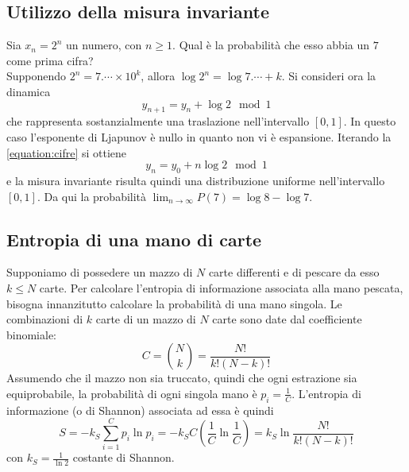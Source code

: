 \documentclass[12pt, a4paper]{book}
\theoremstyle{theorem}
\begin{document}
			\subsection{Utilizzo della misura invariante}
				Sia $x_{n}=2^{n}$ un numero, con $n \geq 1$.
				Qual è la probabilità che esso abbia un $7$ come prima cifra?
				\\Supponendo $2^{n}=7.\cdots\times 10^{k}$, allora $\log{2^{n}}=\log{7.\cdots}+k$.
				Si consideri ora la dinamica
				\begin{equation}
					y_{n+1}=y_{n}+\log2\mod1
					\label{equation:cifre}
				\end{equation}
				che rappresenta sostanzialmente una traslazione nell'intervallo $[0,1]$.
				In questo caso l'esponente di Ljapunov è nullo in quanto non vi è espansione.
				Iterando la \ref{equation:cifre} si ottiene
				\begin{equation*}
					y_{n}=y_{0}+n\log2\mod1
				\end{equation*}
				e la misura invariante risulta quindi una distribuzione uniforme nell'intervallo $[0,1]$.
				Da qui la probabilità $\lim_{n\to\infty}P(7)=\log8-\log7$.
			\subsection{Entropia di una mano di carte}
				Supponiamo di possedere un mazzo di $N$ carte differenti e di pescare da esso $k\leq N$ carte.
				Per calcolare l'entropia di informazione associata alla mano pescata, bisogna innanzitutto calcolare la probabilità di una mano singola.
				Le combinazioni di $k$ carte di un mazzo di $N$ carte sono date dal coefficiente binomiale:
				\begin{equation}
					C=\binom{N}{k}=\frac{N!}{k!(N-k)!}
				\end{equation}
				Assumendo che il mazzo non sia truccato, quindi che ogni estrazione sia equiprobabile, la probabilità di ogni singola mano è $p_{i}=\frac{1}{C}$.
				L'entropia di informazione (o di Shannon) associata ad essa è quindi 
				\begin{equation*}
					S=-k_{S}\sum_{i=1}^{C}p_{i}\ln{p_{i}}=-k_{S}C\left(\frac{1}{C}\ln{\frac{1}{C}}\right)=k_{S}\ln{\frac{N!}{k!(N-k)!}}
				\end{equation*}
				con $k_{S}=\frac{1}{\ln2}$ costante di Shannon.
\end{document}
